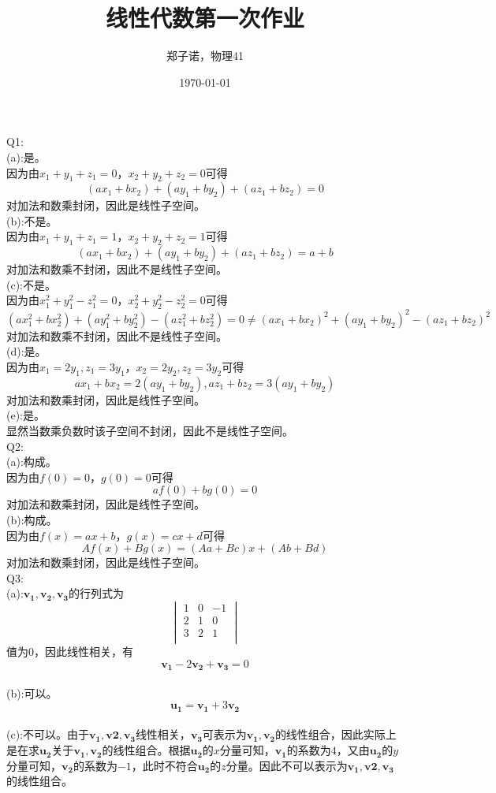 \documentclass[utf8]{ctexart}
\title{线性代数第一次作业}
\author{郑子诺，物理41}
\date{\today}
\begin{document}
\maketitle
\noindent Q1:\\
(a):是。\\因为由$x_1+y_1+z_1=0$，$x_2+y_2+z_2=0$可得$$(ax_1+bx_2)+(ay_1+by_2)+(az_1+bz_2)=0$$对加法和数乘封闭，因此是线性子空间。\\
(b):不是。\\因为由$x_1+y_1+z_1=1$，$x_2+y_2+z_2=1$可得$$(ax_1+bx_2)+(ay_1+by_2)+(az_1+bz_2)=a+b$$对加法和数乘不封闭，因此不是线性子空间。\\
(c):不是。\\因为由$x_1^2+y_1^2-z_1^2=0$，$x_2^2+y_2^2-z_2^2=0$可得$$(ax_1^2+bx_2^2)+(ay_1^2+by_2^2)-(az_1^2+bz_2^2)=0\neq (ax_1+bx_2)^2+(ay_1+by_2)^2-(az_1+bz_2)^2$$对加法和数乘不封闭，因此不是线性子空间。\\
(d):是。\\因为由$x_1=2y_1,z_1=3y_1$，$x_2=2y_2,z_2=3y_2$可得$$ax_1+bx_2=2(ay_1+by_2),az_1+bz_2=3(ay_1+by_2)$$对加法和数乘封闭，因此是线性子空间。\\
(e):是。\\显然当数乘负数时该子空间不封闭，因此不是线性子空间。\\
Q2:\\
(a):构成。\\因为由$f(0)=0$，$g(0)=0$可得$$af(0)+bg(0)=0$$对加法和数乘封闭，因此是线性子空间。\\
(b):构成。\\因为由$f(x)=ax+b$，$g(x)=cx+d$可得$$Af(x)+Bg(x)=(Aa+Bc)x+(Ab+Bd)$$对加法和数乘封闭，因此是线性子空间。\\
Q3:\\
(a):$\mathbf{v_1},\mathbf{v_2},\mathbf{v_3}$的行列式为
$$
\begin{vmatrix}
    1  &0  &-1\\
	2  &1  &0\\
	3  &2  &1\\
\end{vmatrix}
$$
值为$0$，因此线性相关，有$$\mathbf{v_1}-2\mathbf{v_2}+\mathbf{v_3}=0$$\\
(b):可以。$$\mathbf{u_1}=\mathbf{v_1}+3\mathbf{v_2}$$\\
(c):不可以。由于$\mathbf{v_1},\mathbf{v2},\mathbf{v_3}$线性相关，$\mathbf{v_3}$可表示为$\mathbf{v_1},\mathbf{v_2}$的线性组合，因此实际上是在求$\mathbf{u_2}$关于$\mathbf{v_1},\mathbf{v_2}$的线性组合。根据$\mathbf{u_2}$的$x$分量可知，$\mathbf{v_1}$的系数为$4$，又由$\mathbf{u_2}$的$y$分量可知，$\mathbf{v_2}$的系数为$-1$，此时不符合$\mathbf{u_2}$的$z$分量。因此不可以表示为$\mathbf{v_1},\mathbf{v2},\mathbf{v_3}$的线性组合。\\
\end{document}
